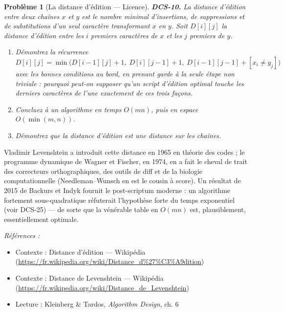 \documentclass[11pt]{article}
\newtheorem{problem}{Problème}
\newenvironment{refs}{\par\small\noindent\emph{Références :}\begin{itemize}\setlength\itemsep{0pt}}{\end{itemize}\normalsize}
\begin{document}
\bigskip

\begin{problem}[{La distance d'édition --- Licence}]
\textbf{DCS-10.} La distance d'édition entre deux chaînes $x$ et $y$ est le nombre minimal d'insertions, de suppressions et de substitutions d'un seul caractère transformant $x$ en $y$. Soit $D[i][j]$ la distance d'édition entre les $i$ premiers caractères de $x$ et les $j$ premiers de $y$.
\begin{enumerate}
\item[(a)] Démontrez la récurrence
\[ D[i][j] = \min\big( D[i-1][j] + 1,\; D[i][j-1] + 1,\; D[i-1][j-1] + [x_i \ne y_j] \big) \]
avec les bonnes conditions au bord, en prenant garde à la seule étape non triviale : pourquoi peut-on supposer qu'un script d'édition optimal touche les derniers caractères de l'une exactement de ces trois façons.
\item[(b)] Concluez à un algorithme en temps $O(mn)$, puis en espace $O(\min(m,n))$.
\item[(c)] Démontrez que la distance d'édition est une distance sur les chaînes.
\end{enumerate}

\end{problem}

\noindent Vladimir Levenshtein a introduit cette distance en 1965 en théorie des codes ; le programme dynamique de Wagner et Fischer, en 1974, en a fait le cheval de trait des correcteurs orthographiques, des outils de diff et de la biologie computationnelle (Needleman--Wunsch en est le cousin à score). Un résultat de 2015 de Backurs et Indyk fournit le post-scriptum moderne : un algorithme fortement sous-quadratique réfuterait l'hypothèse forte du temps exponentiel (voir DCS-25) --- de sorte que la vénérable table en $O(mn)$ est, plausiblement, essentiellement optimale.

\begin{refs}
\item Contexte : Distance d'édition --- Wikipédia (\url{https://fr.wikipedia.org/wiki/Distance_d%27%C3%A9dition})
\item Contexte : Distance de Levenshtein --- Wikipédia (\url{https://fr.wikipedia.org/wiki/Distance_de_Levenshtein})
\item Lecture : Kleinberg \& Tardos, \textit{Algorithm Design}, ch. 6
\end{refs}

\bigskip
\end{document}
